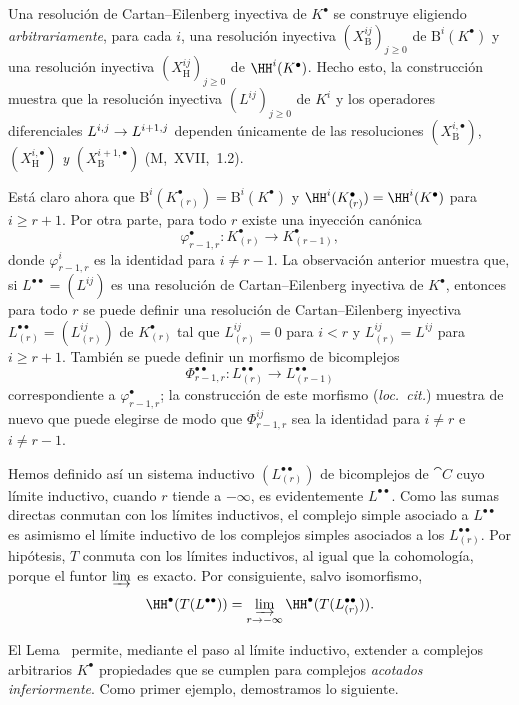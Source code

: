 \documentclass[oneside]{amsart}
\makeatletter
\renewcommand{\geq}{\geqslant}
\newcommand{\ega@arrow}[2]{\mathchoice{#1}{#2}{#2}{#2}}
\renewcommand{\to}{\ega@arrow{\longrightarrow}{\rightarrow}}
\makeatother
\begin{document}
Una resolución de Cartan--Eilenberg inyectiva de $K^\bullet$ se construye eligiendo \emph{arbitrariamente}, para cada $i$, una resolución inyectiva $(X_{\mathrm{B}}^{ij})_{j\geq 0}$ de $\mathrm{B}^i(K^\bullet)$ y una resolución inyectiva $(X_{\mathrm{H}}^{ij})_{j\geq 0}$ de $\HH^i(K^\bullet)$.
Hecho esto, la construcción muestra que la resolución inyectiva $(L^{ij})_{j\geq 0}$ de $K^i$ y los operadores diferenciales $L^{i,j}\to L^{i+1,j}$ dependen únicamente de las resoluciones $(X_{\mathrm{B}}^{i,\bullet})$, $(X_{\mathrm{H}}^{i,\bullet})$ \emph{y} $(X_{\mathrm{B}}^{i+1,\bullet})$ (M,~XVII,~1.2).

Está claro ahora que $\mathrm{B}^i(K^\bullet_{(r)})=\mathrm{B}^i(K^\bullet)$ y $\HH^i(K^\bullet_{(r)})=\HH^i(K^\bullet)$ para $i\geq r+1$.
Por otra parte, para todo $r$ existe una inyección canónica
\[
  \varphi^\bullet_{r-1,r}:K^\bullet_{(r)}\longrightarrow K^\bullet_{(r-1)},
\]
donde $\varphi^i_{r-1,r}$ es la identidad para $i\neq r-1$.
La observación anterior muestra que, si $L^{\bullet\bullet}=(L^{ij})$ es una resolución de Cartan--Eilenberg inyectiva de $K^\bullet$, entonces para todo $r$ se puede definir una resolución de Cartan--Eilenberg inyectiva $L^{\bullet\bullet}_{(r)}=(L^{ij}_{(r)})$ de $K^\bullet_{(r)}$ tal que $L^{ij}_{(r)}=0$ para $i<r$ y $L^{ij}_{(r)}=L^{ij}$ para $i\geq r+1$.
También se puede definir un morfismo de bicomplejos
\[
  \Phi^{\bullet\bullet}_{r-1,r}:L^{\bullet\bullet}_{(r)}
  \longrightarrow L^{\bullet\bullet}_{(r-1)}
\]
correspondiente a $\varphi^\bullet_{r-1,r}$; la construcción de este morfismo (\emph{loc.\ cit.}) muestra de nuevo que puede elegirse de modo que $\Phi^{ij}_{r-1,r}$ sea la identidad para $i\neq r$ e $i\neq r-1$.

Hemos definido así un sistema inductivo $(L^{\bullet\bullet}_{(r)})$ de bicomplejos de $\cat{C}$ cuyo límite inductivo, cuando $r$ tiende a $-\infty$, es evidentemente $L^{\bullet\bullet}$.
Como las sumas directas conmutan con los límites inductivos, el complejo simple asociado a $L^{\bullet\bullet}$ es asimismo el límite inductivo de los complejos simples asociados a los $L^{\bullet\bullet}_{(r)}$.
Por hipótesis, $T$ conmuta con los límites inductivos, al igual que la cohomología, porque el funtor $\varinjlim$ es exacto.
Por consiguiente, salvo isomorfismo,
\[
  \HH^\bullet(T(L^{\bullet\bullet}))
  =\varinjlim_{r\to-\infty}\HH^\bullet(T(L^{\bullet\bullet}_{(r)})).
\]

El Lema~ permite, mediante el paso al límite inductivo, extender a complejos arbitrarios $K^\bullet$ propiedades que se cumplen para complejos \emph{acotados inferiormente}.
Como primer ejemplo, demostramos lo siguiente.
\end{document}
